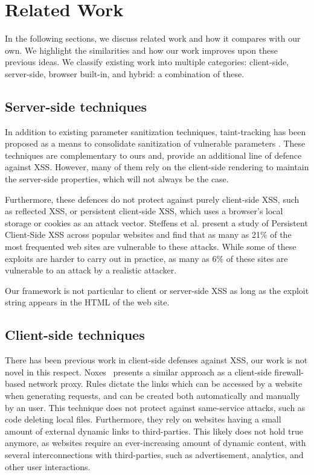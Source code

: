 \section{Related Work}
In the following sections, we discuss related work and how it compares with our own. We highlight the similarities and how our work improves upon these previous ideas. We classify existing work into multiple categories: client-side, server-side, browser built-in, and hybrid: a combination of these.

\subsection{Server-side techniques} In addition to existing parameter sanitization techniques, taint-tracking has been proposed as a means to consolidate sanitization of vulnerable parameters \cite{Xu:2006:TPE:1267336.1267345,DBLP:conf/sec/Nguyen-TuongGGSE05,Pietraszek:2005:DAI:2146257.2146267,Bisht:2008:XPD:1428322.1428325}. These techniques are complementary to ours and, provide an additional line of defence against \ac{XSS}. However, many of them rely on the client-side rendering to maintain the server-side properties, which will not always be the case.

Furthermore, these defences do not protect against purely client-side \ac{XSS}, such as reflected \ac{XSS}, or persistent client-side \ac{XSS}, which uses a browser's local storage or cookies as an attack vector. Steffens et al. \cite{DBLP:conf/ndss/SteffensRJS19} present a study of Persistent Client-Side \ac{XSS} across popular websites and find that as many as 21\% of the most frequented web sites are vulnerable to these attacks.  While some of these exploits are harder to carry out in practice, as many as 6\% of these sites are vulnerable to an attack by a realistic attacker.

Our framework is not particular to client or server-side \ac{XSS} as long as the exploit string appears in the HTML of the web site.

\subsection{Client-side techniques} There has been previous work in client-side defenses against \ac{XSS}, our work is not novel in this respect. Noxes~\cite{Kirda:2009:CCS:2639535.2639808} presents a similar approach as a client-side firewall-based network proxy. Rules dictate the links which can be accessed by a website when generating requests, and can be created both automatically and manually by an user. This technique does not protect against same-service attacks, such as code deleting local files. Furthermore, they rely on websites having a small amount of external dynamic links to third-parties. This likely does not hold true anymore, as websites require an ever-increasing amount of dynamic content, with several interconnections with third-parties, such as advertisement, analytics, and other user interactions.

